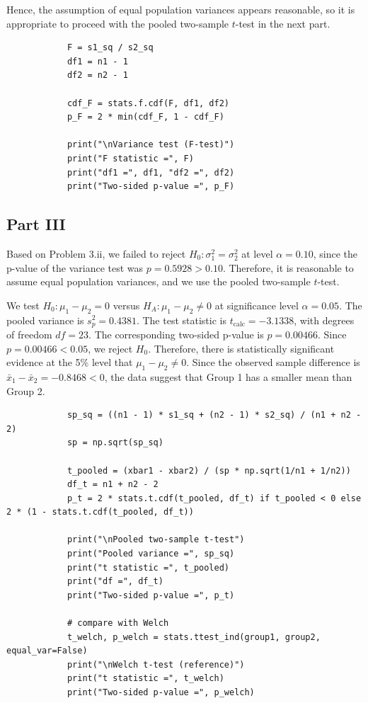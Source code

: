 \documentclass[letterpaper]{article}
\begin{document}
		Hence, the assumption of equal population variances appears reasonable,
		so it is appropriate to proceed with the pooled two-sample $t$-test in
		the next part.
		
		\begin{lstlisting}
			F = s1_sq / s2_sq
			df1 = n1 - 1
			df2 = n2 - 1
			
			cdf_F = stats.f.cdf(F, df1, df2)
			p_F = 2 * min(cdf_F, 1 - cdf_F)
			
			print("\nVariance test (F-test)")
			print("F statistic =", F)
			print("df1 =", df1, "df2 =", df2)
			print("Two-sided p-value =", p_F)
		\end{lstlisting}
		
		\clearpage
		
		\subsection{Part III}
		
		Based on Problem 3.ii, we failed to reject
		$H_0:\sigma_1^2=\sigma_2^2$
		at level $\alpha=0.10$, since the p-value of the variance test was
		$p=0.5928>0.10$.
		Therefore, it is reasonable to assume equal population variances, and we use the pooled two-sample $t$-test.
		
		We test
		$H_0:\mu_1-\mu_2=0$
		versus
		$H_A:\mu_1-\mu_2\neq0$
		at significance level $\alpha=0.05$. The pooled variance is
		$s_p^2=0.4381$. The test statistic is
		$t_{\text{calc}}=-3.1338$,
		with degrees of freedom
		$df=23$. The corresponding two-sided p-value is
		$p=0.00466$. Since $p=0.00466<0.05$, we reject $H_0$. Therefore, there is statistically significant evidence at the 5\% level
		that $\mu_1-\mu_2\neq0$.
		Since the observed sample difference is
		$\bar x_1-\bar x_2=-0.8468<0$,
		the data suggest that Group 1 has a smaller mean than Group 2.
		
		\begin{lstlisting}
			sp_sq = ((n1 - 1) * s1_sq + (n2 - 1) * s2_sq) / (n1 + n2 - 2)
			sp = np.sqrt(sp_sq)
			
			t_pooled = (xbar1 - xbar2) / (sp * np.sqrt(1/n1 + 1/n2))
			df_t = n1 + n2 - 2
			p_t = 2 * stats.t.cdf(t_pooled, df_t) if t_pooled < 0 else 2 * (1 - stats.t.cdf(t_pooled, df_t))
			
			print("\nPooled two-sample t-test")
			print("Pooled variance =", sp_sq)
			print("t statistic =", t_pooled)
			print("df =", df_t)
			print("Two-sided p-value =", p_t)
			
			# compare with Welch
			t_welch, p_welch = stats.ttest_ind(group1, group2, equal_var=False)
			print("\nWelch t-test (reference)")
			print("t statistic =", t_welch)
			print("Two-sided p-value =", p_welch)
		\end{lstlisting}
		
\end{document}
